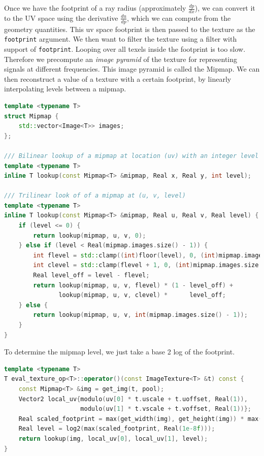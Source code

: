Once we have the footprint of a ray radius (approximately $\frac{dp}{dx}$), we can convert it to the UV space using the derivative $\frac{du}{dp}$, which we can compute from the geometry quantities. This uv space footprint is then passed to the texture as the \lstinline{footprint} argument. We then want to filter the texture using a filter with support of \lstinline{footprint}. Looping over all texels inside the footprint is too slow. Therefore we precompute an \emph{image pyramid} of the texture for representing signals at different frequencies. This image pyramid is called the Mipmap. We can then reconstruct a value of a texture with a certain footprint, by linearly interpolating levels between a mipmap.

\begin{lstlisting}[language=c++]
template <typename T>
struct Mipmap {
    std::vector<Image<T>> images;
};

/// Bilinear lookup of a mipmap at location (uv) with an integer level
template <typename T>
inline T lookup(const Mipmap<T> &mipmap, Real x, Real y, int level);

/// Trilinear look of of a mipmap at (u, v, level)
template <typename T>
inline T lookup(const Mipmap<T> &mipmap, Real u, Real v, Real level) {
    if (level <= 0) {
        return lookup(mipmap, u, v, 0);
    } else if (level < Real(mipmap.images.size() - 1)) {
        int flevel = std::clamp((int)floor(level), 0, (int)mipmap.images.size() - 1);
        int clevel = std::clamp(flevel + 1, 0, (int)mipmap.images.size() - 1);
        Real level_off = level - flevel;
        return lookup(mipmap, u, v, flevel) * (1 - level_off) +
               lookup(mipmap, u, v, clevel) *      level_off;
    } else {
        return lookup(mipmap, u, v, int(mipmap.images.size() - 1));
    }
}
\end{lstlisting}

To determine the mipmap level, we just take a base 2 log of the footprint.
\begin{lstlisting}[language=c++]
template <typename T>
T eval_texture_op<T>::operator()(const ImageTexture<T> &t) const {
    const Mipmap<T> &img = get_img(t, pool);
    Vector2 local_uv{modulo(uv[0] * t.uscale + t.uoffset, Real(1)),
                     modulo(uv[1] * t.vscale + t.voffset, Real(1))};
    Real scaled_footprint = max(get_width(img), get_height(img)) * max(t.uscale, t.vscale) * footprint;
    Real level = log2(max(scaled_footprint, Real(1e-8f)));
    return lookup(img, local_uv[0], local_uv[1], level);
}
\end{lstlisting}

